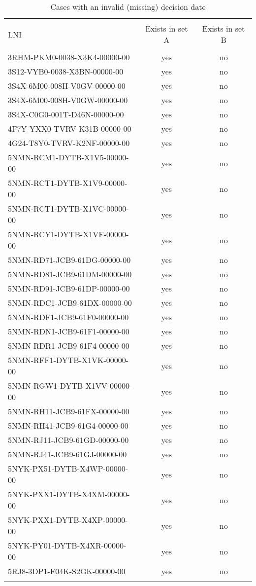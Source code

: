 \documentclass[10pt, letterpaper]{article}
\begin{document}
\begin{spacing}{1.0}
\begin{table}[H]
    \centering
    \caption{Cases with an invalid (missing) decision date}
    \begin{tabular}{p{2.5in}cc}
        \hline\\[-6pt]
        LNI & Exists in set A & Exists in set B\\[4pt]
        \hline\\[-6pt]
        3RHM-PKM0-0038-X3K4-00000-00 & yes & no\\
        3S12-VYB0-0038-X3BN-00000-00 & yes & no\\
        3S4X-6M00-008H-V0GV-00000-00 & yes & no\\
        3S4X-6M00-008H-V0GW-00000-00 & yes & no\\
        3S4X-C0G0-001T-D46N-00000-00 & yes & no\\
        4F7Y-YXX0-TVRV-K31B-00000-00 & yes & no\\
        4G24-T8Y0-TVRV-K2NF-00000-00 & yes & no\\
        5NMN-RCM1-DYTB-X1V5-00000-00 & yes & no\\
        5NMN-RCT1-DYTB-X1V9-00000-00 & yes & no\\
        5NMN-RCT1-DYTB-X1VC-00000-00 & yes & no\\
        5NMN-RCY1-DYTB-X1VF-00000-00 & yes & no\\
        5NMN-RD71-JCB9-61DG-00000-00 & yes & no\\
        5NMN-RD81-JCB9-61DM-00000-00 & yes & no\\
        5NMN-RD91-JCB9-61DP-00000-00 & yes & no\\
        5NMN-RDC1-JCB9-61DX-00000-00 & yes & no\\
        5NMN-RDF1-JCB9-61F0-00000-00 & yes & no\\
        5NMN-RDN1-JCB9-61F1-00000-00 & yes & no\\
        5NMN-RDR1-JCB9-61F4-00000-00 & yes & no\\
        5NMN-RFF1-DYTB-X1VK-00000-00 & yes & no\\
        5NMN-RGW1-DYTB-X1VV-00000-00 & yes & no\\
        5NMN-RH11-JCB9-61FX-00000-00 & yes & no\\
        5NMN-RH41-JCB9-61G4-00000-00 & yes & no\\
        5NMN-RJ11-JCB9-61GD-00000-00 & yes & no\\
        5NMN-RJ41-JCB9-61GJ-00000-00 & yes & no\\
        5NYK-PX51-DYTB-X4WP-00000-00 & yes & no\\
        5NYK-PXX1-DYTB-X4XM-00000-00 & yes & no\\
        5NYK-PXX1-DYTB-X4XP-00000-00 & yes & no\\
        5NYK-PY01-DYTB-X4XR-00000-00 & yes & no\\
        5RJ8-3DP1-F04K-S2GK-00000-00 & yes & no\\[4pt]
        \hline\\
    \end{tabular}
    \label{tab:invalidDate}
\end{table}


\end{spacing}
\end{document}
